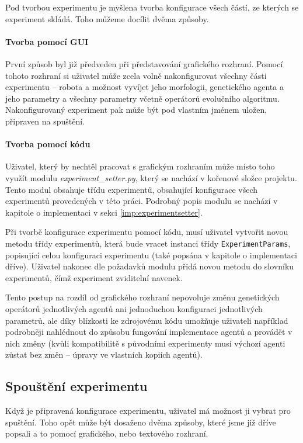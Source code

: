 Pod tvorbou experimentu je myšlena tvorba konfigurace všech částí, ze kterých
se experiment skládá. Toho můžeme docílit dvěma způsoby. 

\paragraph{Tvorba pomocí GUI}
První způsob byl již předveden při představování grafického rozhraní.
Pomocí tohoto rozhraní si uživatel může zcela volně nakonfigurovat všechny
části experimentu -- robota a možnost vyvíjet jeho morfologii, genetického
agenta a jeho parametry a všechny parametry včetně operátorů evolučního
algoritmu. Nakonfigurovaný experiment pak může být pod vlastním jménem uložen,
připraven na spuštění.

\paragraph{Tvorba pomocí kódu}
Uživatel, který by nechtěl pracovat s grafickým rozhraním může místo toho
využít modulu \emph{experiment\_setter.py}, který se nachází v kořenové složce
projektu. Tento modul obsahuje třídu experimentů, obsahující konfigurace všech
experimentů provedených v této práci. Podrobný popis modulu se nachází v
kapitole o implementaci v sekci \ref{imp:experimentsetter}.

Při tvorbě konfigurace experimentu pomocí kódu, musí uživatel vytvořit novou
metodu třídy experimentů, která bude vracet instanci třídy
\texttt{ExperimentParams}, popisující celou konfiguraci experimentu (také
popsána v kapitole o implementaci dříve). Uživatel nakonec dle požadavků modulu
přidá novou metodu do slovníku experimentů, čímž experiment zviditelní navenek.

Tento postup na rozdíl od grafického rozhraní nepovoluje změnu genetických
operátorů jednotlivých agentů ani jednoduchou konfiguraci jednotlivých
parametrů, ale díky blízkosti ke zdrojovému kódu umožňuje uživateli například
podrobněji nahlédnout do způsobu fungování implementace agentů a provádět v
nich změny (kvůli kompatibilitě s původními experimenty musí výchozí agenti
zůstat bez změn -- úpravy ve vlastních kopiích agentů).

\subsection{Spouštění experimentu} \label{doc_22_cooking}
Když je připravená konfigurace experimentu, uživatel má možnost ji vybrat pro
spuštění. Toho opět může být dosaženo dvěma způsoby, které jsme již dříve
popsali a to pomocí grafického, nebo textového rozhraní.

